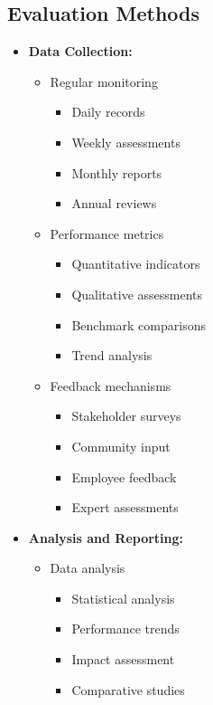 \subsection{Evaluation Methods}
\begin{itemize}
    \item \textbf{Data Collection:}
    \begin{itemize}
        \item Regular monitoring
        \begin{itemize}
            \item Daily records
            \item Weekly assessments
            \item Monthly reports
            \item Annual reviews
        \end{itemize}
        
        \item Performance metrics
        \begin{itemize}
            \item Quantitative indicators
            \item Qualitative assessments
            \item Benchmark comparisons
            \item Trend analysis
        \end{itemize}
        
        \item Feedback mechanisms
        \begin{itemize}
            \item Stakeholder surveys
            \item Community input
            \item Employee feedback
            \item Expert assessments
        \end{itemize}
    \end{itemize}
    
    \item \textbf{Analysis and Reporting:}
    \begin{itemize}
        \item Data analysis
        \begin{itemize}
            \item Statistical analysis
            \item Performance trends
            \item Impact assessment
            \item Comparative studies
        \end{itemize}
        

\end{itemize}
\end{itemize}
